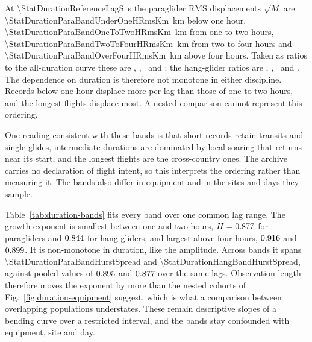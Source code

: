 At \SI{\StatDurationReferenceLagS}{\second} the paraglider RMS displacements
$\sqrt{M}$ are \SI{\StatDurationParaBandUnderOneHRmsKm}{\kilo\metre} below one hour,
\SI{\StatDurationParaBandOneToTwoHRmsKm}{\kilo\metre} from one to two hours,
\SI{\StatDurationParaBandTwoToFourHRmsKm}{\kilo\metre} from two to four hours and
\SI{\StatDurationParaBandOverFourHRmsKm}{\kilo\metre} above four hours. Taken as ratios
to the all-duration curve these are \StatDurationParaBandUnderOneHRatio,
\StatDurationParaBandOneToTwoHRatio, \StatDurationParaBandTwoToFourHRatio\ and
\StatDurationParaBandOverFourHRatio; the hang-glider ratios are
\StatDurationHangBandUnderOneHRatio, \StatDurationHangBandOneToTwoHRatio,
\StatDurationHangBandTwoToFourHRatio\ and \StatDurationHangBandOverFourHRatio.
The dependence on duration is therefore not monotone in either discipline. Records
below one hour displace more per lag than those of one to two hours, and the longest
flights displace most. A nested comparison cannot represent this ordering.

One reading consistent with these bands is that short records retain transits and
single glides, intermediate durations are dominated by local soaring that returns near
its start, and the longest flights are the cross-country ones. The archive carries no
declaration of flight intent, so this interprets the ordering rather than measuring it.
The bands also differ in equipment and in the sites and days they sample.

Table~\ref{tab:duration-bands} fits every band over one common lag range. The growth
exponent is smallest between one and two hours,
$H=0.877$ for paragliders and
$0.844$ for hang gliders, and largest above four hours,
$0.916$ and $0.899$. It is
non-monotone in duration, like the amplitude. Across bands it spans
\num{\StatDurationParaBandHurstSpread} and \num{\StatDurationHangBandHurstSpread},
against pooled values of $0.895$ and
$0.877$ over the same lags. Observation length therefore moves
the exponent by more than the nested cohorts of Fig.~\ref{fig:duration-equipment}
suggest, which is what a comparison between overlapping populations understates.
These remain descriptive slopes of a bending curve over a restricted interval, and the
bands stay confounded with equipment, site and day.

\begin{table}[tb]
 \centering\small
 \caption{Effective growth exponents by duration band, all fitted over the same
 \SIrange{\StatDurationBandFitMinS}{\StatDurationBandFitMaxS}{\second}, the intersection
 of the four bands' supports. Here $b$ is the log--log slope of $M_{[T_0,T_1)}$ and
 $H=b/2$ the exponent of the corresponding magnitude. The residual measures departure
 from the fitted line, not sampling uncertainty. The all-duration row is refitted over
 these same lags, so it compares with the bands rather than with the wider ranges quoted
 elsewhere in this chapter.}
 \label{tab:duration-bands}
 
\end{table}

